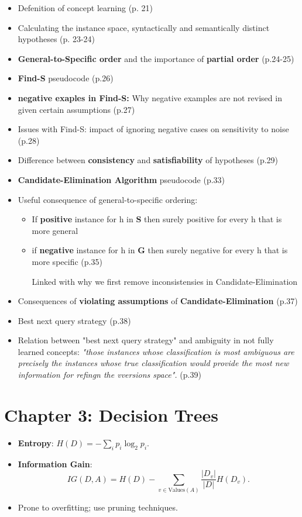 \documentclass[10pt,a4paper]{article}
\begin{document}
\begin{itemize}
	\item Defenition of concept learning (p. 21)
	\item Calculating the instance space, syntactically and semantically distinct hypotheses (p. 23-24)
	\item \textbf{General-to-Specific order} and the importance of \textbf{partial order} (p.24-25)
	\item \textbf{Find-S} pseudocode (p.26)
	\item \textbf{negative exaples in Find-S:} Why negative examples are not revised in given certain assumptions (p.27)  
	\item Issues with Find-S: impact of ignoring negative cases on sensitivity to noise (p.28)
	\item Difference between \textbf{consistency} and \textbf{satisfiability } of hypotheses (p.29) 
	\item \textbf{Candidate-Elimination Algorithm} pseudocode (p.33)   
	\item Useful consequence of general-to-specific ordering:
	\begin{itemize}
		\item If \textbf{positive}  instance for h in \textbf{S} then surely positive for every h that is more general
		\item if \textbf{negative} instance for h in \textbf{G}  then surely negative for every h that is more specific (p.35)
		
		Linked with why we first remove inconsistensies in Candidate-Elimination
	\end{itemize}
	\item Consequences of \textbf{violating assumptions} of \textbf{Candidate-Elimination }  (p.37)
	\item Best next query strategy (p.38)
	\item Relation between "best next query strategy" and ambiguity in not fully learned concepts: \emph{"those instances whose classification is most ambiguous are precisely the instances whose true classification would provide the most new information for refingn the vversions space". } (p.39)
\end{itemize}
\section*{Chapter 3: Decision Trees}
\begin{itemize}
    \item \textbf{Entropy}: \( H(D) = - \sum_{i} p_i \log_2 p_i \).
    \item \textbf{Information Gain}:
    \[
    IG(D, A) = H(D) - \sum_{v \in \text{Values}(A)} \frac{|D_v|}{|D|} H(D_v).
    \]
    \item Prone to overfitting; use pruning techniques.
\end{itemize}
\end{document}
